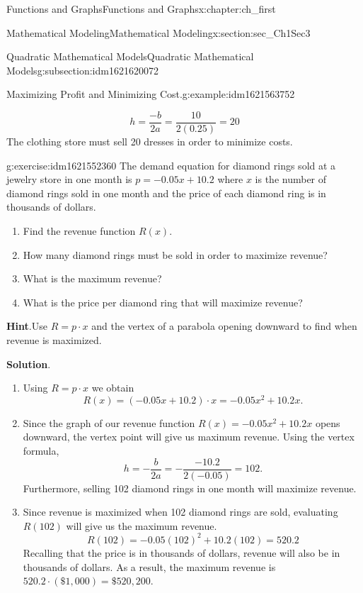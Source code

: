 \documentclass[oneside,10pt,]{book}
\newcommand{\blocktitlefont}{\relax}
\numberwithin{equation}{section}
\begin{document}
\begin{chapterptx}{Functions and Graphs}{}{Functions and Graphs}{}{}{x:chapter:ch_first}
\begin{sectionptx}{Mathematical Modeling}{}{Mathematical Modeling}{}{}{x:section:sec_Ch1Sec3}
\begin{subsectionptx}{Quadratic Mathematical Models}{}{Quadratic Mathematical Models}{}{}{g:subsection:idm1621620072}
\begin{example}{Maximizing Profit and Minimizing Cost.}{g:example:idm1621563752}
\begin{enumerate}
\begin{equation*}
h=\frac{-b}{2a}=\frac{10}{2(0.25)}=20
\end{equation*}
The clothing store must sell 20 dresses in order to minimize costs.%
\end{enumerate}
\end{example}
\begin{inlineexercise}{}{g:exercise:idm1621552360}%
The demand equation for diamond rings sold at a jewelry store in one month is \(p=-0.05x+10.2\) where \(x\) is the number of diamond rings sold in one month and the price of each diamond ring is in thousands of dollars.%
%
\begin{enumerate}
\item{}Find the revenue function \(R(x)\).%
\item{}How many diamond rings must be sold in order to maximize revenue?%
\item{}What is the maximum revenue?%
\item{}What is the price per diamond ring that will maximize revenue?%
\end{enumerate}
\par\smallskip%
\noindent\textbf{\blocktitlefont Hint}.\hypertarget{g:hint:idm1621550184}{}\quad{}Use \(R=p\cdot x\) and the vertex of a parabola opening downward to find when revenue is maximized.\par\smallskip%
\noindent\textbf{\blocktitlefont Solution}.\hypertarget{g:solution:idm1621548264}{}\quad{}%
\begin{enumerate}
\item{}Using \(R=p\cdot x\) we obtain%
\begin{equation*}
R(x)=(-0.05x+10.2)\cdot x=-0.05x^2+10.2x.
\end{equation*}
%
\item{}Since the graph of our revenue function \(R(x)=-0.05x^2+10.2x\) opens downward, the vertex point will give us maximum revenue. Using the vertex formula,%
\begin{equation*}
h=-\frac{b}{2a}=-\frac{-10.2}{2(-0.05)}=102.
\end{equation*}
Furthermore, selling 102 diamond rings in one month will maximize revenue.%
\item{}Since revenue is maximized when 102 diamond rings are sold, evaluating \(R(102)\) will give us the maximum revenue.%
\begin{equation*}
R(102)=-0.05(102)^2+10.2(102)=520.2
\end{equation*}
Recalling that the price is in thousands of dollars, revenue will also be in thousands of dollars. As a result, the maximum revenue is \(520.2\cdot(\$ 1,000)=\$ 520,200\).%

\end{enumerate}
\end{inlineexercise}
\end{subsectionptx}
\end{sectionptx}
\end{chapterptx}
\end{document}

